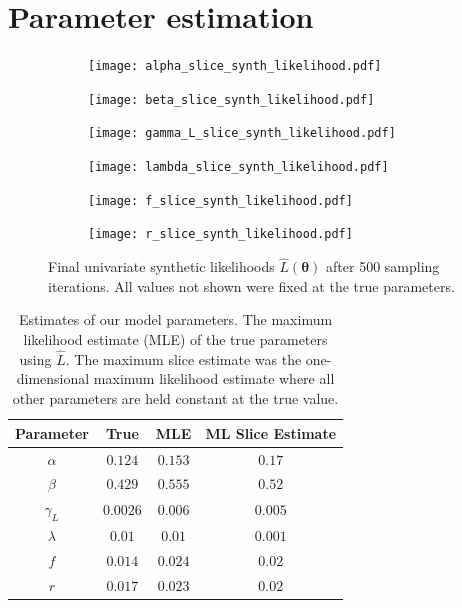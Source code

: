 \section{Parameter estimation}

\begin{figure}[htbp]
    \centering
    \begin{subfigure}[b]{0.5\textwidth}
        \centering
        \texttt{[image: alpha\_slice\_synth\_likelihood.pdf]}
    \end{subfigure}%
    \hfill%
    \begin{subfigure}[b]{0.5\textwidth}
        \centering
        \texttt{[image: beta\_slice\_synth\_likelihood.pdf]}
    \end{subfigure}
    \begin{subfigure}[b]{0.5\textwidth}
        \centering
        \texttt{[image: gamma\_L\_slice\_synth\_likelihood.pdf]}
    \end{subfigure}%
    \hfill%
    \begin{subfigure}[b]{0.5\textwidth}
        \centering
        \texttt{[image: lambda\_slice\_synth\_likelihood.pdf]}
    \end{subfigure}
    \begin{subfigure}[b]{0.5\textwidth}
        \centering
        \texttt{[image: f\_slice\_synth\_likelihood.pdf]}
    \end{subfigure}%
    \hfill%
    \begin{subfigure}[b]{0.5\textwidth}
        \centering
        \texttt{[image: r\_slice\_synth\_likelihood.pdf]}
    \end{subfigure}%
    \caption{
        Final univariate synthetic likelihoods $\hat{L}(\bm{\theta})$ after
        500 sampling iterations. All values not shown were fixed at the true
        parameters.
    }
    \label{fig:final_synth_lik}
\end{figure}

\begin{table}[htbp]
    \caption{
        Estimates of our model parameters.
        The maximum likelihood estimate (MLE) of the true parameters using
        $\hat{L}.$ The maximum slice estimate was the one-dimensional
        maximum likelihood estimate where all other parameters are held
        constant at the true value.
    }
    \label{tab:param_est}
    \centering
    \begin{tabular}{c | c | c | c}
        Parameter  & True     & MLE     & ML Slice Estimate \\
        \hline
        $\alpha$   & $0.124$  & $0.153$ & $0.17$            \\
        $\beta $   & $0.429$  & $0.555$ & $0.52$            \\
        $\gamma_L$ & $0.0026$ & $0.006$ & $0.005$           \\
        $\lambda$  & $0.01$   & $0.01$  & $0.001$           \\
        $f$        & $0.014$  & $0.024$ & $0.02$            \\
        $r$        & $0.017$  & $0.023$ & $0.02$            \\
    \end{tabular}
\end{table}

